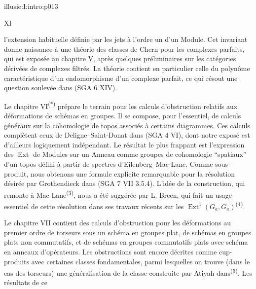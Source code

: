 \IllusieSetPhysicalPageSize{450.6bp}{704bp}
\begin{illusiefrontpage}{illusie:I:intro:p013}{}
\begin{center}\fontsize{10}{12}\selectfont XI\end{center}
\vspace{12bp}
\hypertarget{illusie:I:intro:p013:p1}{}%
l'extension habituelle définie par les jets à l'ordre un d'un Module. Cet invariant
donne naissance à une théorie des classes de Chern pour les complexes parfaits,
qui est exposée au chapitre V, après quelques préliminaires sur les catégories
dérivées de complexes filtrés. La théorie contient en particulier celle du
polynôme caractéristique d'un endomorphisme d'un complexe parfait, ce qui résout
une question soulevée dans (SGA 6 XIV).

\vspace{4bp}
\hypertarget{illusie:I:intro:p013:p2}{}%
Le chapitre VI\textsuperscript{(*)} prépare le terrain pour les calculs
d'obstruction relatifs aux déformations de schémas en groupes. Il se compose,
pour l'essentiel, de calculs généraux sur la cohomologie de topos associés à
certains diagrammes. Ces calculs complètent ceux de Deligne--Saint-Donat dans
(SGA 4 VI), dont notre exposé est d'ailleurs logiquement indépendant. Le résultat
le plus frappant est l'expression des $\operatorname{Ext}$ de Modules sur un
Anneau comme groupes de cohomologie ``spatiaux'' d'un topos défini à partir de
spectres d'Eilenberg--Mac-Lane. Comme sous-produit, nous obtenons une formule
explicite remarquable pour la résolution désirée par Grothendieck dans
(SGA 7 VII 3.5.4). L'idée de la construction, qui remonte à
Mac-Lane\textsuperscript{(3)}, nous a été suggérée par L. Breen, qui fait un usage
essentiel de cette résolution dans ses travaux récents sur les
$\operatorname{Ext}^{1}(G_a,G_a)$\textsuperscript{(4)}.

\vspace{4bp}
\hypertarget{illusie:I:intro:p013:p3}{}%
Le chapitre VII contient des calculs d'obstruction pour les déformations au
premier ordre de torseurs sous un schéma en groupes plat, de schémas en groupes
plats non commutatifs, et de schémas en groupes commutatifs plats avec schéma en
anneaux d'opérateurs. Les obstructions sont encore décrites comme cup-produits
avec certaines classes fondamentales, parmi lesquelles on trouve (dans le cas des
torseurs) une généralisation de la classe construite par Atiyah
dans\textsuperscript{(5)}. Les résultats de ce


\end{illusiefrontpage}
